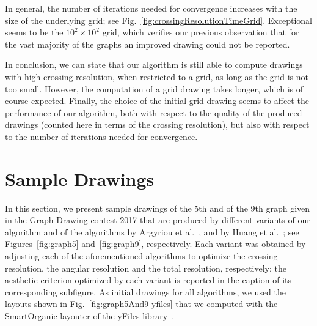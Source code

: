 \documentclass{comjnl}
\begin{document}
In general, the number of iterations needed for convergence increases with the size of the underlying grid; see Fig.~\ref{fig:crossingResolutionTimeGrid}. Exceptional seems to be the $10^2 \times 10^2$ grid, which verifies our previous observation that for the vast majority of the graphs an improved drawing could not be reported.

In conclusion, we can state that our algorithm is still able to compute drawings with high crossing resolution, when restricted to a grid, as long as the grid is not too small. However, the computation of a grid drawing takes longer, which is of course expected. Finally, the choice of the initial grid drawing seems to affect the performance of our algorithm, both with respect to the quality of the produced drawings (counted here in terms of the crossing resolution), but also with respect to the number of iterations needed for convergence.

\section{Sample Drawings}
\label{sec:samples}

In this section, we present sample drawings of the 5th and of the 9th graph given in the Graph Drawing contest 2017 that are produced by different variants of our algorithm and of the algorithms by Argyriou et al.~\cite{DBLP:journals/cj/ArgyriouBS13}, and by Huang et al.~\cite{DBLP:journals/vlc/HuangEHL13}; see Figures~\ref{fig:graph5} and~\ref{fig:graph9}, respectively. Each variant was obtained by adjusting each of the aforementioned algorithms to optimize the crossing resolution, the angular resolution and the total resolution, respectively; the aesthetic criterion optimized by each variant is reported in the caption of its corresponding subfigure. As initial drawings for all algorithms, we used the layouts shown in Fig.~\ref{fig:graph5And9-yfiles} that we computed with the SmartOrganic layouter of the yFiles library~\cite{DBLP:books/sp/04/WieseE004}.
\end{document}
